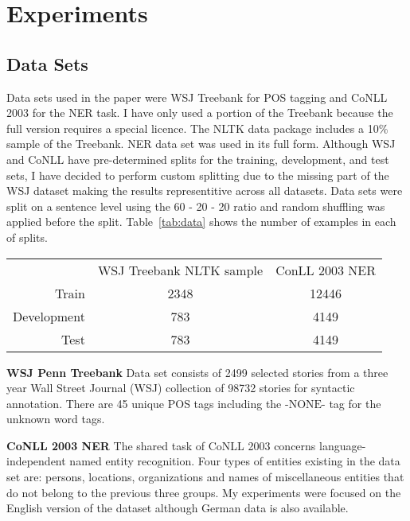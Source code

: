 \section{Experiments}

\subsection{Data Sets}
Data sets used in the paper were WSJ Treebank for POS tagging and CoNLL 2003
for the NER task. I have only used a portion of the Treebank because
the full version requires a special licence. The NLTK data package includes a
10\% sample of the Treebank. NER data set was used in its full form.
Although WSJ and CoNLL have pre-determined splits for the training,
development, and test sets, I have decided to perform custom splitting due to
the missing part of the WSJ dataset making the results representitive across
all datasets.
Data sets were split on a sentence level using the 60 - 20 - 20 ratio
and random shuffling was applied before the split. Table~\ref{tab:data} shows
the number of examples in each of splits.

\begin{center}
\begin{tabular}{r|c|c|}
\multicolumn{1}{r}{}
 &  \multicolumn{1}{c}{WSJ Treebank NLTK sample}
 & \multicolumn{1}{c}{ConLL 2003 NER} \\
\cline{2-3}
Train & 2348 & 12446 \\
\cline{2-3}
Development & 783 & 4149 \\
\cline{2-3}
Test & 783 & 4149 \\
\cline{2-3}
\end{tabular}
\label{tab:data}
\end{center}


\textbf{WSJ Penn Treebank}
Data set consists of 2499 selected stories from a three year Wall Street
Journal (WSJ) collection of 98732 stories for syntactic annotation. There are
45 unique POS tags including the $\text{-NONE-}$ tag for the unknown word tags. 

\textbf{CoNLL 2003 NER}
The shared task of CoNLL 2003 concerns language-independent named entity
recognition. Four types of entities existing in the data set are: persons,
locations, organizations and names of miscellaneous entities that do not belong
to the previous three groups. My experiments were focused on the English
version of the dataset although German data is also available.

